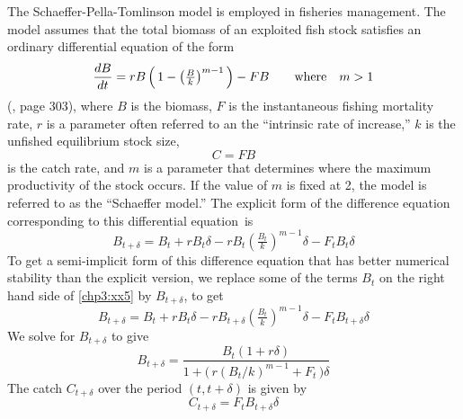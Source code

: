 \documentclass{admbmanual}
\begin{document}
The Schaeffer-Pella-Tomlinson model is employed in 
fisheries management. The model assumes that the total
biomass of an exploited fish stock satisfies an
ordinary differential equation of the form
\begin{equation}
\frac{dB}{dt}=rB\left(\,1-\left(\tfrac{B}{k}\right)^{m-1}\,\right) 
           - FB  \qquad \hbox{\rm where}\quad m>1
\label{chp3:xx3}
\end{equation} 
(\cite{hilbornwalters1991}, page 303), where
$B$ is the biomass, $F$ is the instantaneous fishing mortality rate,
 $r$ is a parameter often 
referred to an the ``intrinsic rate of increase,'' $k$ is the
unfished  equilibrium stock size,   
\begin{equation}
  {C=FB}
\label{chp3:xx4}
\end{equation} 
is the catch rate, and $m$ is a parameter that determines
where the maximum productivity of the stock occurs. 
If the value of $m$ is fixed at 2, the model is referred to as the
``Schaeffer model.''
The explicit form of the difference equation corresponding to
this differential equation~is
\begin{equation}
  {B_{t+\delta}=B_t+rB_t\delta-rB_t\left(\tfrac{B_t}{k}\right)^{m-1}\delta 
     - F_tB_t\delta}
  \label{chp3:xx5}
\end{equation} 
To get a semi-implicit form of this difference equation that has
better numerical stability than the explicit version,
we replace some of the terms $B_t$ on the
right hand side of \ref{chp3:xx5} by $B_{t+\delta}$, to get
\begin{equation}
{B_{t+\delta}
   =B_t+rB_t\delta-rB_{t+\delta}\left(\tfrac{B_t}{k}\right)^{m-1}\delta 
     - F_tB_{t+\delta}\delta}
 \label{chp3:xx6}
\end{equation} 
We solve for $B_{t+\delta}$ to give
\begin{equation}
{B_{t+\delta}
   =\frac{B_t(1+r\delta)}{1+\big(\,r(B_t/k)^{m-1}+F_t\,\big)\delta}}
  \label{chp3:xx7}
\end{equation} 
The catch $C_{t+\delta}$ over the period $(t,t+\delta)$
is given by
\begin{equation}
 {C_{t+\delta} =F_tB_{t+\delta}\delta }
  \label{chp3:xx8}
\end{equation} 
\end{document}
